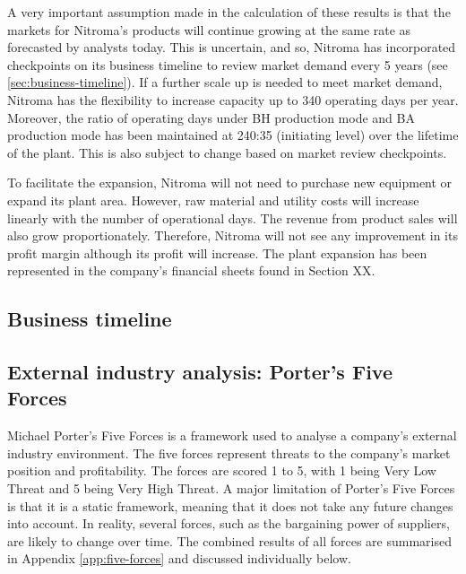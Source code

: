 A very important assumption made in the calculation of these results is that the markets for Nitroma’s products will continue growing at the same rate as forecasted by analysts today. This is uncertain, and so, Nitroma has incorporated checkpoints on its business timeline to review market demand every 5 years (see \cref{sec:business-timeline}). If a further scale up is needed to meet market demand, Nitroma has the flexibility to increase capacity up to 340 operating days per year. Moreover, the ratio of operating days under BH production mode and BA production mode has been maintained at 240:35 (initiating level) over the lifetime of the plant. This is also subject to change based on market review checkpoints.

To facilitate the expansion, Nitroma will not need to purchase new equipment or expand its plant area. However, raw material and utility costs will increase linearly with the number of operational days. The revenue from product sales will also grow proportionately. Therefore, Nitroma will not see any improvement in its profit margin although its profit will increase. The plant expansion has been represented in the company’s financial sheets found in Section XX.

\subsection{Business timeline}

\subsection{External industry analysis: Porter's Five Forces}
\label{sec:five-forces}
Michael Porter’s Five Forces is a framework used to analyse a company’s external industry environment. The five forces represent threats to the company’s market position and profitability. The forces are scored 1 to 5, with 1 being Very Low Threat and 5 being Very High Threat. A major limitation of Porter’s Five Forces is that it is a static framework, meaning that it does not take any future changes into account. In reality, several forces, such as the bargaining power of suppliers, are likely to change over time. The combined results of all forces are summarised in Appendix \ref{app:five-forces} and discussed individually below.

